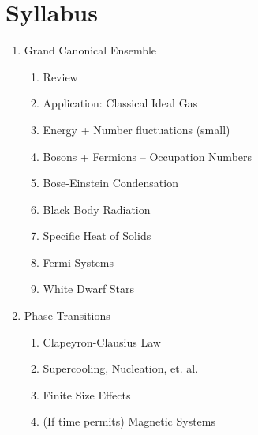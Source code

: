 \documentclass[12pt]{article}
\begin{document}
\section*{Syllabus}
\begin{enumerate}[label=\Roman*)]
    \item Grand Canonical Ensemble
    \begin{enumerate}[label=\Alph*)]
        \item Review
        \item Application: Classical Ideal Gas
        \item Energy + Number fluctuations (small)
        \item Bosons + Fermions -- Occupation Numbers
        \item Bose-Einstein Condensation
        \item Black Body Radiation
        \item Specific Heat of Solids
        \item Fermi Systems
        \item White Dwarf Stars
    \end{enumerate}
    \item Phase Transitions
    \begin{enumerate}[label=\Alph*)]
        \item Clapeyron-Clausius Law
        \item Supercooling, Nucleation, et. al.
        \item Finite Size Effects
        \item (If time permits) Magnetic Systems
    \end{enumerate}
\end{enumerate}
\end{document}
